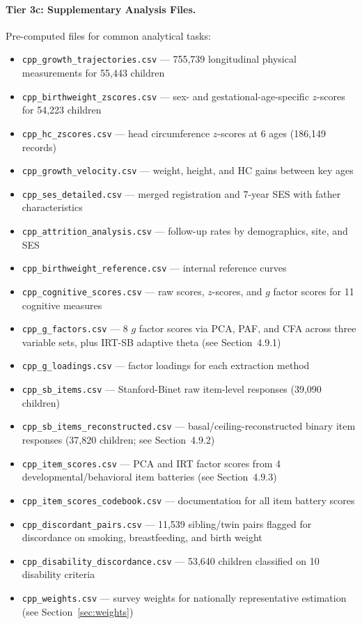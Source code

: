 \documentclass[12pt]{article}
\begin{document}
\paragraph{Tier 3c: Supplementary Analysis Files.}
Pre-computed files for common analytical tasks:
\begin{itemize}
\setlength{\itemsep}{2pt}
    \item \texttt{cpp\_growth\_trajectories.csv} --- 755,739 longitudinal physical measurements for 55,443 children
    \item \texttt{cpp\_birthweight\_zscores.csv} --- sex- and gestational-age-specific $z$-scores for 54,223 children
    \item \texttt{cpp\_hc\_zscores.csv} --- head circumference $z$-scores at 6 ages (186,149 records)
    \item \texttt{cpp\_growth\_velocity.csv} --- weight, height, and HC gains between key ages
    \item \texttt{cpp\_ses\_detailed.csv} --- merged registration and 7-year SES with father characteristics
    \item \texttt{cpp\_attrition\_analysis.csv} --- follow-up rates by demographics, site, and SES
    \item \texttt{cpp\_birthweight\_reference.csv} --- internal reference curves
    \item \texttt{cpp\_cognitive\_scores.csv} --- raw scores, $z$-scores, and $g$ factor scores for 11 cognitive measures
    \item \texttt{cpp\_g\_factors.csv} --- 8 $g$ factor scores via PCA, PAF, and CFA across three variable sets, plus IRT-SB adaptive theta (see Section~4.9.1)
    \item \texttt{cpp\_g\_loadings.csv} --- factor loadings for each extraction method
    \item \texttt{cpp\_sb\_items.csv} --- Stanford-Binet raw item-level responses (39,090 children)
    \item \texttt{cpp\_sb\_items\_\allowbreak reconstructed.csv} --- basal/ceiling-reconstructed binary item responses (37,820 children; see Section~4.9.2)
    \item \texttt{cpp\_item\_scores.csv} --- PCA and IRT factor scores from 4 developmental/behavioral item batteries (see Section~4.9.3)
    \item \texttt{cpp\_item\_scores\_codebook.csv} --- documentation for all item battery scores
    \item \texttt{cpp\_discordant\_pairs.csv} --- 11,539 sibling/twin pairs flagged for discordance on smoking, breastfeeding, and birth weight
    \item \texttt{cpp\_disability\_discordance.csv} --- 53,640 children classified on 10 disability criteria
    \item \texttt{cpp\_weights.csv} --- survey weights for nationally representative estimation (see Section~\ref{sec:weights})
\end{itemize}
\end{document}
